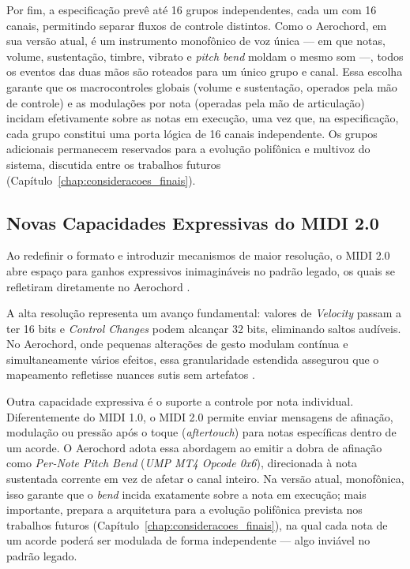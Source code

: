 Por fim, a especificação prevê até 16 grupos independentes, cada um com 16 canais, permitindo separar fluxos de controle distintos. Como o Aerochord, em sua versão atual, é um instrumento monofônico de voz única — em que notas, volume, sustentação, timbre, vibrato e \textit{pitch bend} moldam o mesmo som —, todos os eventos das duas mãos são roteados para um único grupo e canal. Essa escolha garante que os macrocontroles globais (volume e sustentação, operados pela mão de controle) e as modulações por nota (operadas pela mão de articulação) incidam efetivamente sobre as notas em execução, uma vez que, na especificação, cada grupo constitui uma porta lógica de 16 canais independente. Os grupos adicionais permanecem reservados para a evolução polifônica e multivoz do sistema, discutida entre os trabalhos futuros (Capítulo~\ref{chap:consideracoes_finais}).

\subsection{Novas Capacidades Expressivas do MIDI 2.0}
Ao redefinir o formato e introduzir mecanismos de maior resolução, o MIDI 2.0 abre espaço para ganhos expressivos inimagináveis no padrão legado, os quais se refletiram diretamente no Aerochord \cite{MIDI2Overview2023,UMPProtocol2023}.

A alta resolução representa um avanço fundamental: valores de \textit{Velocity} passam a ter 16 bits e \textit{Control Changes} podem alcançar 32 bits, eliminando saltos audíveis. No Aerochord, onde pequenas alterações de gesto modulam contínua e simultaneamente vários efeitos, essa granularidade estendida assegurou que o mapeamento refletisse nuances sutis sem artefatos \cite{UMPProtocol2023}.

Outra capacidade expressiva é o suporte a controle por nota individual. Diferentemente do MIDI 1.0, o MIDI 2.0 permite enviar mensagens de afinação, modulação ou pressão após o toque (\textit{aftertouch}) para notas específicas dentro de um acorde. O Aerochord adota essa abordagem ao emitir a dobra de afinação como \textit{Per-Note Pitch Bend} (\textit{UMP MT4 Opcode 0x6}), direcionada à nota sustentada corrente em vez de afetar o canal inteiro. Na versão atual, monofônica, isso garante que o \textit{bend} incida exatamente sobre a nota em execução; mais importante, prepara a arquitetura para a evolução polifônica prevista nos trabalhos futuros (Capítulo~\ref{chap:consideracoes_finais}), na qual cada nota de um acorde poderá ser modulada de forma independente — algo inviável no padrão legado.

